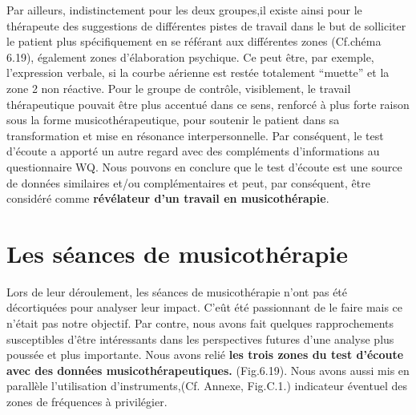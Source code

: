 Par ailleurs, indistinctement pour les deux
 groupes,il existe ainsi pour le thérapeute des
 suggestions de différentes pistes de travail dans le but de 
 solliciter le patient plus spécifiquement en se référant aux
              différentes zones (Cf.chéma 6.19), également zones
 d'élaboration psychique. Ce peut être, par exemple,
              l'expression verbale, si la courbe aérienne est restée
              totalement ``muette'' et la zone 2 non
              réactive. Pour le groupe de contrôle, visiblement, le travail
                thérapeutique pouvait être plus accentué dans ce
                sens, renforcé à plus forte raison sous la forme musicothérapeutique, pour soutenir le
                patient dans sa transformation et mise en résonance
                interpersonnelle.
                Par conséquent,  le test d'écoute a
                apporté un autre regard avec des compléments d'informations au questionnaire
                WQ.
               Nous pouvons en conclure que le test
                d'écoute est une source de données similaires
                et/ou complémentaires et peut, par conséquent, être
                considéré comme \textbf{révélateur d'un
                travail en musicothérapie}.

 \section{Les séances de musicothérapie}
               Lors de leur déroulement, les séances de
               musicothérapie n'ont pas été 
décortiquées pour analyser leur impact. C'eût
été passionnant de le faire mais ce n'était pas notre objectif.
Par contre, nous avons fait quelques rapprochements
susceptibles d'être intéressants dans les perspectives futures d'une analyse plus
poussée et plus importante. Nous avons  relié\textbf{ les trois zones du
test d'écoute avec des données musicothérapeutiques.}
(Fig.6.19).
Nous avons aussi mis 
en parallèle  l'utilisation d'instruments,(Cf. Annexe, Fig.C.1.)
indicateur éventuel des zones de fréquences à
privilégier.




